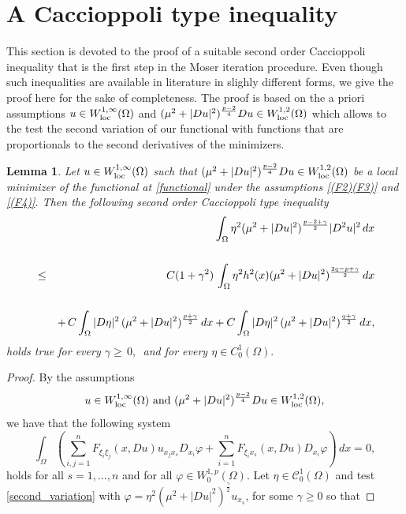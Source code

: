 \documentclass[12pt]{amsart}
\newtheorem{lemma}[theorem]{Lemma}
\theoremstyle{definition}
\numberwithin{equation}{section}
\def\loc{\rm loc}
\def\loc{\rm loc}
\numberwithin{equation}{section}
\begin{document}
{\section{A Caccioppoli type inequality}
This section is devoted to the proof of a suitable second order Caccioppoli inequality that is the first step in the Moser iteration procedure. Even though such inequalities are available in literature in slighly different forms, we give the proof here for the sake of completeness. The proof is based on the a priori assumptions $u\in W^{1,\infty}_{\loc}(\Omega)$ and $(\mu^2+|Du|^2)^{\frac{p-2}{4}}Du\in W^{1,2}_{\loc}(\Omega)$ which allows to the test the second variation of our functional with functions that are proportionals to the second derivatives of the minimizers.
\begin{lemma}
Let $u\in W^{1,\infty}_{\loc}(\Omega)$ such that $(\mu^2+|Du|^2)^{\frac{p-2}{4}}Du\in W^{1,2}_{\loc}(\Omega)$ be  a local minimizer of the functional at \eqref{functional} under the assumptions \eqref{(F2)(F3)} and \eqref{(F4)}. Then the following second order Caccioppoli type inequality
\begin{eqnarray}\label{Caccioppoli}
 && \int_{\Omega} \eta^2 (\mu^2 + |Du|^2)^{\frac{p-2+\gamma}{2}}  |D^2 u|^2 \, dx\cr\cr
&\le & C (1+\gamma^2)  \, \int_{\Omega} {\eta^2} h^2(x)(\mu^2 + |Du|^2)^{\frac{2q-p+\gamma}{2} }  \, dx\cr\cr
&&+ \, C \int_{\Omega} |D \eta|^2 \,  (\mu^2 + |Du|^2)^{\frac{{p +\gamma}}{2}}  \, dx+C \int_{\Omega} |D \eta|^2 \,  (\mu^2 + |Du|^2)^{\frac{{q +\gamma}}{2}}  \, dx,
\end{eqnarray}
holds true for every $\gamma \ge \,0,\,$ and for every $\eta\in C^1_0(\Omega).$
\end{lemma}
\color{black}
\begin{proof}
By the assumptions 
\begin{equation}
\label{regE}
u \in  W^{1,\infty}_{\loc}(\Omega)\,\, \text{and}  \,\, (\mu^2+|Du|^2)^{\frac{p-2}{4}}Du\in W^{1,2}_{\loc}(\Omega),
\end{equation}
we have that the following system
\begin{equation}
\label{second_variation}
\int_{\Omega} \left (\sum_{i,j=1}^n  F_{\xi_i \xi_j}(x, Du)u_{x_j x_s}D_{x_i} \varphi  + \sum_{i=1}^n F_{\xi_i x_s}(x, Du) D_{x_i} \varphi \right ) \, dx = 0,
\end{equation}
holds for all $s = 1, \dots, n$ and for all $\varphi \in W^{1,p}_0(\Omega)$. Let $\eta \in \mathcal{C}^1_0(\Omega)$ and test \eqref{second_variation} with $\varphi=\eta^2
({\mu}^2+|Du|^2)^{\frac{\gamma}{2}} u_{x_s}$, for some $\gamma \ge 0$ so that

\end{proof}}
\end{document}
